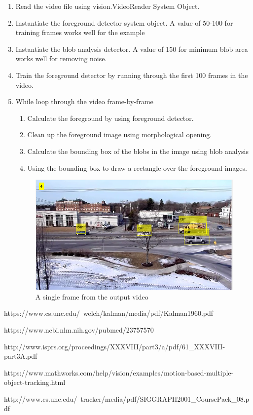 \documentclass{article}
\begin{document}
\begin{enumerate}
	\item Read the video file using vision.VideoReader System Object.
	
	\item Instantiate the foreground detector system object. A value of 50-100 for training frames works well for the example
	
	\item Instantiate the blob analysis detector. A value of 150 for minimum blob area works well for removing noise. 
	
	\item Train the foreground detector by running through the first 100 frames in the video.
	
	\item While loop through the video frame-by-frame
	
	\begin{enumerate}
		\item Calculate the foreground by using foreground detector.
		\item Clean up the foreground image using morphological opening.
		\item Calculate the bounding box of the blobs in the image using blob analysis
		\item Using the bounding box to draw a rectangle over the foreground images.
	\end{enumerate}

	\begin{figure}[!h]
		\centering
		\includegraphics[scale = 1.0]{figures/output.png}
		\caption{A single frame from the output video}
	\end{figure}
	
\end{enumerate}
	\pagebreak
	\begin{thebibliography}{4}
		 https://www.cs.unc.edu/~welch/kalman/media/pdf/Kalman1960.pdf 
		
		https://www.ncbi.nlm.nih.gov/pubmed/23757570
		
		 http://www.isprs.org/proceedings/XXXVIII/part3/a/pdf/61\_XXXVIII-part3A.pdf
		
		https://www.mathworks.com/help/vision/examples/motion-based-multiple-object-tracking.html
		
		 http://www.cs.unc.edu/~tracker/media/pdf/SIGGRAPH2001\_CoursePack\_08.pdf	
	\end{thebibliography}
	
\end{document}
